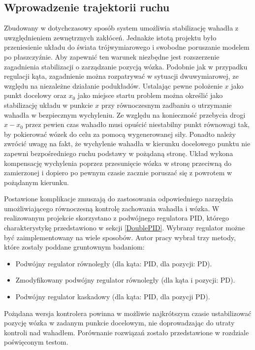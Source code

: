 \documentclass[12pt, twoside, openany]{report}
\theoremstyle{definition}
\begin{document}
\subsection{Wprowadzenie trajektorii ruchu}
Zbudowany w dotychczasowy sposób system umożliwia stabilizację wahadła z uwzględnieniem zewnętrznych zakłóceń. Jednakże istotą projektu było przeniesienie układu do świata trójwymiarowego i swobodne poruszanie modelem po płaszczyźnie. Aby zapewnić ten warunek niezbędne jest rozszerzenie zagadnienia stabilizacji o zarządzanie pozycją wózka. Podobnie jak w przypadku regulacji kąta, zagadnienie można rozpatrywać w sytuacji dwuwymiarowej, ze względu na niezależne działanie podukładów. Ustalając pewne położenie $x$ jako punkt docelowy oraz $x_0$ jako miejsce startu problem można określić jako stabilizację układu w punkcie $x$ przy równoczesnym zadbaniu o utrzymanie wahadła w bezpiecznym wychyleniu. Ze względu na konieczność przebycia drogi $x - x_0$ przez pewien czas wahadło musi opuścić niestabilny punkt równowagi tak, by pokierować wózek do celu za pomocą wygenerowanej siły. Ponadto należy zwrócić uwagę na fakt, że wychylenie wahadła w kierunku docelowego punktu nie zapewni bezpośredniego ruchu podstawy w pożądaną stronę. Układ wykona kompensację wychylenia poprzez przesunięcie wózka w stronę przeciwną do zamierzonej i dopiero po pewnym czasie zacznie poruszać się z powrotem w pożądanym kierunku. 

Postawione komplikacje zmuszają do zastosowania odpowiedniego narzędzia umożliwiającego równoczesną kontrolę zachowania wahadła i wózka. W realizowanym projekcie skorzystano z podwójnego regulatora PID, którego charakterystykę przedstawiono w sekcji \ref{DoublePID}. Wybrany regulator możne być zaimplementowany na wiele sposobów. Autor pracy wybrał trzy metody, które zostały poddane gruntownym badaniom:
\begin{itemize}
\item Podwójny regulator równoległy (dla kąta: PID, dla pozycji: PD).
\item Zmodyfikowany podwójny regulator równoległy (dla kąta i pozycji: PD).
\item Podwójny regulator kaskadowy (dla kąta: PID, dla pozycji PD).
\end{itemize}

Pożądana wersja kontrolera powinna w możliwie najkrótszym czasie ustabilizować pozycję wózka w zadanym punkcie docelowym, nie doprowadzając do utraty kontroli nad wahadłem. Porównanie rozwiązań zostało przedstawione w rozdziale poświęconym testom. 
\end{document}
